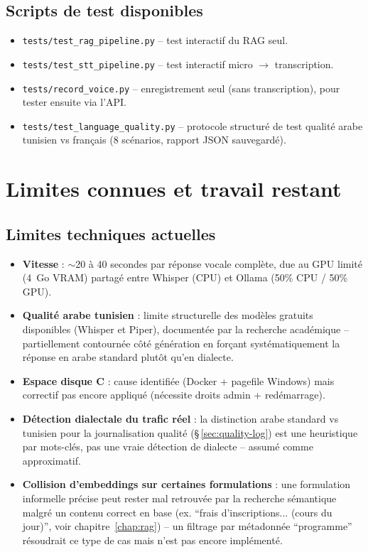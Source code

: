 \documentclass[11pt,a4paper]{report}
\begin{document}
\section{Scripts de test disponibles}
\begin{itemize}
    \item \texttt{tests/test\_rag\_pipeline.py} -- test interactif du RAG seul.
    \item \texttt{tests/test\_stt\_pipeline.py} -- test interactif micro $\to$ transcription.
    \item \texttt{tests/record\_voice.py} -- enregistrement seul (sans transcription),
    pour tester ensuite via l'API.
    \item \texttt{tests/test\_language\_quality.py} -- protocole structuré de test
    qualité arabe tunisien vs français (8 scénarios, rapport JSON sauvegardé).
\end{itemize}

\chapter{Limites connues et travail restant}

\section{Limites techniques actuelles}
\begin{statutlimite}
\begin{itemize}
    \item \textbf{Vitesse} : $\sim$20 à 40 secondes par réponse vocale complète, due au
    GPU limité (4~Go VRAM) partagé entre Whisper (CPU) et Ollama (50\% CPU / 50\% GPU).
    \item \textbf{Qualité arabe tunisien} : limite structurelle des modèles gratuits
    disponibles (Whisper et Piper), documentée par la recherche académique -- partiellement
    contournée côté génération en forçant systématiquement la réponse en arabe standard
    plutôt qu'en dialecte.
    \item \textbf{Espace disque C} : cause identifiée (Docker + pagefile Windows) mais
    correctif pas encore appliqué (nécessite droits admin + redémarrage).
    \item \textbf{Détection dialectale du trafic réel} : la distinction arabe standard vs
    tunisien pour la journalisation qualité (\S\,\ref{sec:quality-log}) est une
    heuristique par mots-clés, pas une vraie détection de dialecte -- assumé comme
    approximatif.
    \item \textbf{Collision d'embeddings sur certaines formulations} : une formulation
    informelle précise peut rester mal retrouvée par la recherche sémantique malgré un
    contenu correct en base (ex. ``frais d'inscriptions... (cours du jour)'', voir
    chapitre~\ref{chap:rag}) -- un filtrage par métadonnée ``programme'' résoudrait ce
    type de cas mais n'est pas encore implémenté.
\end{itemize}
\end{statutlimite}
\end{document}
